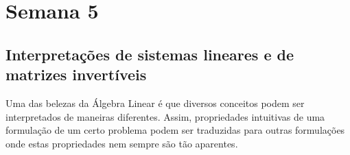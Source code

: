 



%

\chapter{Semana 5}

\section{Interpretações de sistemas lineares e de matrizes invertíveis}

Uma das belezas da Álgebra Linear é que diversos conceitos podem ser interpretados de maneiras diferentes. Assim, propriedades intuitivas de uma formulação de um certo problema podem ser traduzidas para outras formulações onde estas propriedades nem sempre são tão aparentes.

